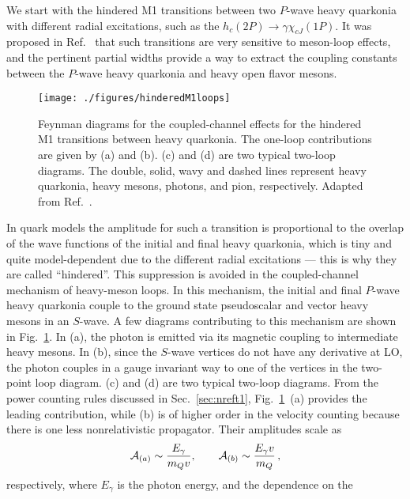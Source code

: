 We start with the hindered M1 transitions between two $P$-wave heavy quarkonia
with different radial excitations, such as the $h_c(2P)\to \gamma
\chi_{cJ}(1P)$. It was proposed in Ref.~\cite{Guo:2011dv,Guo:2016yxl} that such
transitions are very sensitive to meson-loop effects, and the pertinent partial
widths provide a way to extract the coupling constants between the $P$-wave
heavy quarkonia and heavy open flavor mesons.
\begin{figure}[t]
    \centering \texttt{[image: ./figures/hinderedM1loops]}
    \caption{Feynman diagrams for the coupled-channel effects for the hindered
    M1 transitions between heavy quarkonia. The one-loop contributions are given
by (a) and (b). (c) and (d) are two typical two-loop diagrams.
The double, solid, wavy and dashed lines represent heavy quarkonia, heavy
mesons, photons, and pion, respectively. Adapted from Ref.~\cite{Guo:2011dv}.
\label{fig:M1loops}}
\end{figure}
In quark models the amplitude for such a transition is proportional to the
overlap of the wave functions of the initial and final heavy quarkonia, which is
tiny and quite model-dependent due to the different radial excitations --- this
is why they are called ``hindered''. This suppression is avoided in the
coupled-channel mechanism of heavy-meson loops.
In this mechanism, the initial and final $P$-wave heavy quarkonia couple to the
ground state pseudoscalar and vector heavy mesons in an $S$-wave. A few diagrams
contributing to this mechanism are shown in Fig.~\ref{fig:M1loops}. In (a), the
photon is emitted via its magnetic coupling to intermediate heavy mesons. In
(b), since the $S$-wave vertices do not have any derivative at LO, the photon
couples in a gauge invariant way to one of the vertices in the two-point loop
diagram. (c) and (d) are two typical two-loop diagrams. From the power counting
rules discussed in Sec.~\ref{sec:nreft1}, Fig.~\ref{fig:M1loops}~(a) provides
the leading contribution, while (b) is of higher order in the velocity counting
because there is one less nonrelativistic propagator. Their amplitudes scale as
\begin{equation}
  \mathcal{A}_{(a)}  \sim \frac{E_\gamma}{m_Q v}, \qquad \mathcal{A}_{(b)}  \sim 
\frac{E_\gamma v}{m_Q}\,,
\label{eq:M1Aab}
\end{equation}
respectively,
where $E_\gamma$ is the photon energy, and the dependence on the 
